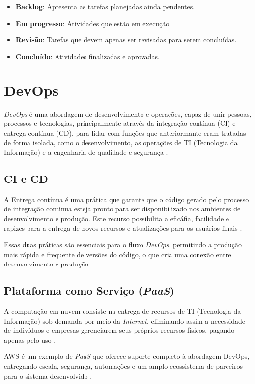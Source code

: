 \begin{itemize}
    \item \textbf{Backlog}: Apresenta as tarefas planejadas ainda pendentes.
    \item \textbf{Em progresso}: Atividades que estão em execução.
    \item \textbf{Revisão}: Tarefas que devem apenas ser revisadas para serem concluídas.
    \item \textbf{Concluído}: Atividades finalizadas e aprovadas.
\end{itemize}


\section{DevOps}
\textit{DevOps} é uma abordagem de desenvolvimento e operações, capaz de unir pessoas, processos e tecnologias, principalmente através da integração contínua (CI) e entrega contínua (CD), para lidar com funções que anteriormante eram tratadas de forma isolada, como o desenvolvimento, as operações de TI (Tecnologia da Informação) e a engenharia de qualidade e segurança \cite{microsoftdevops}.

\subsection{CI e CD}
A Entrega contínua é uma prática que garante que o código gerado pelo processo de integração contínua esteja pronto para ser disponibilizado nos ambientes de desenvolvimento e produção. Este recurso possibilita a eficáfia, facilidade e rapizes para a entrega de novos recursos e atualizações para os usuários finais \cite{gomes2023}.

Essas duas práticas são essenciais para o fluxo \textit{DevOps}, permitindo a produção mais rápida e frequente de versões do código, o que cria uma conexão entre desenvolvimento e produção.

\subsection{Plataforma como Serviço (\textit{PaaS})}
A computação em nuvem consiste na entrega de recursos de TI (Tecnologia da Informação) sob demanda por meio da \textit{Internet}, eliminando assim a necessidade de indivíduos e empresas gerenciarem seus próprios recursos físicos, pagando apenas pelo uso \cite{awscloudcomputing}.

AWS é um exemplo de \textit{PaaS} que oferece suporte completo à abordagem DevOps, entregando escala, segurança, automações e um amplo ecossistema de parceiros para o sistema desenvolvido \cite{awsdevops}.

